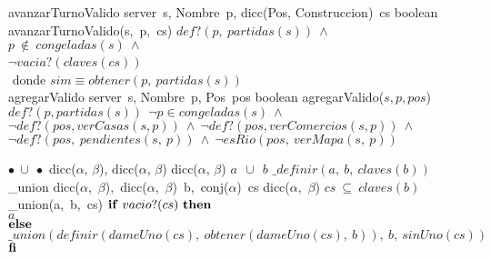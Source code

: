 \tadOperacion
    {avanzarTurnoValido}
    {server\ s, Nombre\ p, dicc(Pos, Construccion)\ cs}
    {boolean}
    {}
\tadAxioma
    {avanzarTurnoValido(s,\ p,\ cs)}
    {$
        def?(p,\ partidas(s))\ \land\ $\\$
        p\ \notin\ congeladas(s)\ \land\ $\\$ 
        \neg vacia?(claves(cs))\ $\yluego\ \\$
    $}
\tab donde $sim \equiv obtener(p,\ partidas(s))$  
\\
\tadOperacion
    {agregarValido}
    {server\ s, Nombre\ p, Pos\ pos}
    {boolean}
    {}
\tadAxioma
    {agregarValido($s, p, pos$)}
    {$
        def?(p, partidas(s))\ $\yluego$\ \lnot p \in congeladas(s)\ \wedge\ $\\$
        \lnot def?(pos, verCasas(s, p))\ \wedge\ \lnot def?(pos, verComercios(s, p))\ \wedge\ $\\$
        \lnot def?(pos,\ pendientes(s,\ p))\ \wedge\ \lnot esRio(pos,\ verMapa(s,\ p)) $\\$
$}

\tadOperacion
    {$\bullet\ \cup\ \bullet$}
    {dicc($\alpha$, $\beta$), dicc($\alpha$, $\beta$)}
    {dicc($\alpha$, $\beta$)}
    {}
\tadAxioma
    {$a\ \ \cup\ \ b$}
    {$ \_definir(a,\ b,\ claves(b))$}
\vspace{4mm}
\tadOperacion
    {\_union}
    {dicc($\alpha$,\ $\beta$),\ dicc($\alpha$,\ $\beta$)\ b,\ conj($\alpha$)\ cs}
    {dicc($\alpha$,\ $\beta$)}
    {$cs\ \subseteq\ claves(b)$}
\tadAxioma
    {\_union(a,\ b,\ cs)}
    {$ 
    \LIF\ vacio?(cs)\ \LTHEN\ $\\$ 
    $\tab$ a $\\$
    \textrm{\textbf{else}} $\\$ 
    $\tab$ \_union(definir(dameUno(cs),\ obtener(dameUno(cs),\ b)),\ b,\ sinUno(cs)) $\\$ 
    \textrm{\textbf{fi}}
    $}
